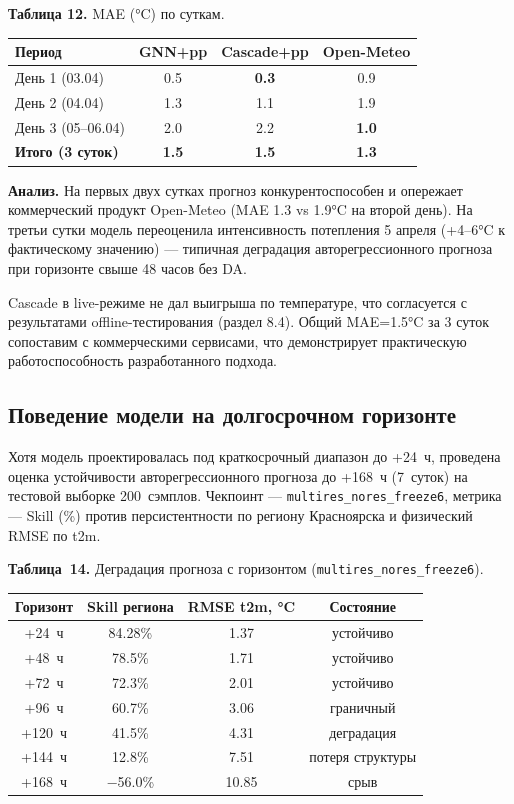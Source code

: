 \documentclass[14pt,a4paper]{extarticle}
\newcounter{none}
\numberwithin{table}{section}
\numberwithin{figure}{section}
\numberwithin{equation}{section}
\begin{document}
\textbf{Таблица 12.} MAE (°C) по суткам.

{\def\LTcaptype{none} %
\begin{longtable}[]{@{}lccc@{}}
\toprule\noalign{}
Период & GNN+pp & Cascade+pp & Open-Meteo \\
\midrule\noalign{}
\endhead
\bottomrule\noalign{}
\endlastfoot
День 1 (03.04) & 0.5 & \textbf{0.3} & 0.9 \\
День 2 (04.04) & 1.3 & 1.1 & 1.9 \\
День 3 (05--06.04) & 2.0 & 2.2 & \textbf{1.0} \\
\textbf{Итого (3 суток)} & \textbf{1.5} & \textbf{1.5} & \textbf{1.3} \\
\end{longtable}
}

\textbf{Анализ.} На первых двух сутках прогноз конкурентоспособен и
опережает коммерческий продукт Open-Meteo (MAE 1.3 vs 1.9°C на второй
день). На третьи сутки модель переоценила интенсивность потепления 5
апреля (+4--6°C к фактическому значению) --- типичная деградация
авторегрессионного прогноза при горизонте свыше 48 часов без DA.

Cascade в live-режиме не дал выигрыша по температуре, что согласуется с
результатами offline-тестирования (раздел 8.4). Общий MAE=1.5°C за 3
суток сопоставим с коммерческими сервисами, что демонстрирует
практическую работоспособность разработанного подхода.

\subsection{Поведение модели на долгосрочном горизонте}\label{ux434ux43eux43bux433ux43eux441ux440ux43eux447ux43dux44bux439-ux433ux43eux440ux438ux437ux43eux43dux442}

Хотя модель проектировалась под краткосрочный диапазон до +24~ч,
проведена оценка устойчивости авторегрессионного прогноза до +168~ч
(7~суток) на тестовой выборке 200~сэмплов. Чекпоинт ---
\texttt{multires\_nores\_freeze6}, метрика --- Skill (\%) против
персистентности по региону Красноярска и физический RMSE по t2m.

\textbf{Таблица~14.} Деградация прогноза с горизонтом
(\texttt{multires\_nores\_freeze6}).

{\def\LTcaptype{none}
\begin{longtable}[]{@{}cccc@{}}
\toprule\noalign{}
Горизонт & Skill региона & RMSE t2m, °C & Состояние \\
\midrule\noalign{}
\endhead
\bottomrule\noalign{}
\endlastfoot
+24~ч  & 84.28\% & 1.37 & устойчиво \\
+48~ч  & 78.5\%  & 1.71 & устойчиво \\
+72~ч  & 72.3\%  & 2.01 & устойчиво \\
+96~ч  & 60.7\%  & 3.06 & граничный \\
+120~ч & 41.5\%  & 4.31 & деградация \\
+144~ч & 12.8\%  & 7.51 & потеря структуры \\
+168~ч & −56.0\% & 10.85 & срыв \\
\end{longtable}
}
\end{document}
